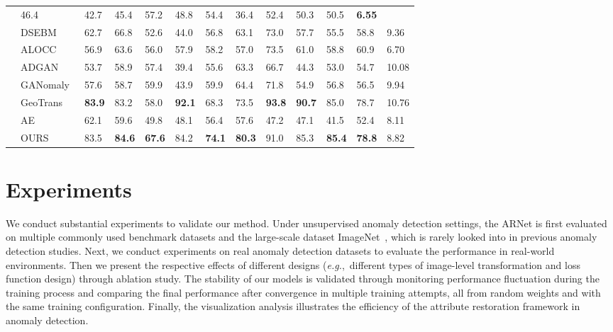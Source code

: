 \documentclass[journal]{IEEEtran}
\begin{document}
\begin{table*}[!htb]
\begin{minipage}[t]{0.92\textwidth}
\begin{tabular}{cx{2.0cm}x{0.7cm}x{0.7cm}x{0.7cm}x{0.7cm}x{0.7cm}x{0.7cm}x{0.7cm}x{0.7cm}x{0.7cm}x{0.7cm}x{0.8cm}}
		& 46.4 & 42.7 & 45.4 & 57.2 & 48.8 & 54.4 & 36.4 & 52.4 & 50.3 & 50.5 & \textbf{6.55}\\
		& DSEBM~\cite{zong2018deep}  
		& 62.7 & 66.8 & 52.6 & 44.0 & 56.8 & 63.1 & 73.0 & 57.7 & 55.5 & 58.8 & 9.36\\
		& ALOCC~\cite{Sabokrou2018Adversarially}
		& 56.9 & 63.6 & 56.0 & 57.9 & 58.2 & 57.0 & 73.5 & 61.0 & 58.8 & 60.9 & 6.70\\
		& ADGAN~\cite{deecke2018image} 
		& 53.7 & 58.9 & 57.4 & 39.4 & 55.6 & 63.3 & 66.7 & 44.3 & 53.0 & 54.7 & 10.08\\
		& GANomaly~\cite{Akcay2018} 
		& 57.6 & 58.7 & 59.9 & 43.9 & 59.9 & 64.4 & 71.8 & 54.9 & 56.8 & 56.5 & 9.94\\
		& GeoTrans~\cite{golan2018deep} 
		& \textbf{83.9} & 83.2 & 58.0 & \textbf{92.1} & 68.3 & 73.5 & \textbf{93.8} & \textbf{90.7} & 85.0 & 78.7 & 10.76 \\
		\cmidrule(lr){2-2} \cmidrule(lr){3-3} \cmidrule(lr){4-4} \cmidrule(lr){5-5} \cmidrule(lr){6-6} \cmidrule(lr){7-7} \cmidrule(lr){8-8} \cmidrule(lr){9-9} \cmidrule(lr){10-10} \cmidrule(lr){11-11} \cmidrule(lr){12-12} \cmidrule(lr){13-13}
		& AE & 62.1 & 59.6 & 49.8 & 48.1 & 56.4 & 57.6 & 47.2 & 47.1 & 41.5 & 52.4 & 8.11\\
		& OURS & 83.5 & \textbf{84.6} & \textbf{67.6} & 84.2 & \textbf{74.1} & \textbf{80.3} & 91.0 & 85.3 & \textbf{85.4} & \textbf{78.8} & 8.82\\
		\bottomrule
	\end{tabular}
	\end{minipage}
\label{tal:AUC1}
\end{table*}

\section{Experiments}
\label{sec:experiment}
We conduct substantial experiments to validate our method. Under unsupervised anomaly detection settings, the ARNet is first evaluated on multiple commonly used benchmark datasets and the large-scale dataset ImageNet~\cite{russakovsky2015imagenet}, which is rarely looked into in previous anomaly detection studies. Next, we conduct experiments on real anomaly detection datasets to evaluate the performance in real-world environments. Then we present the respective effects of different designs (\emph{e.g.},~different types of image-level transformation and loss function design) through ablation study. The stability of our models is validated through monitoring performance fluctuation during the training process and comparing the final performance after convergence in multiple training attempts, all from random weights and with the same training configuration. Finally, the visualization analysis illustrates the efficiency of the attribute restoration framework in anomaly detection.
\end{document}
